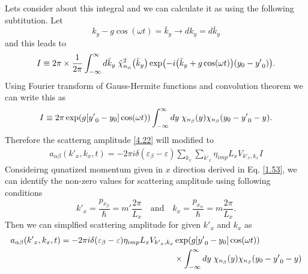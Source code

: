 \noindent
Lets consider about this integral and we can calculate it as using the following subtitution. Let
\begin{equation} \label{4.39}
  {k}_y -g\cos(\omega t) = \bar{k}_y \longrightarrow d{k}_y = d\bar{k}_y
\end{equation}
and this leads to
\begin{equation} \label{4.40}
    I \equiv
    2\pi \times \frac{1}{2\pi}
    \int_{-\infty}^{\infty} d\bar{k}_y \;
    \tilde{\chi}_{n_{\alpha}}^2 \qty(\bar{k}_y)
    \exp(
      -i\qty(\bar{k}_y + g\cos(\omega t)) \qty(y_0 - {y'}_0)
    ).
\end{equation}
Using Fourier transform of Gauss-Hermite functions and convolution theorem we can write this as
\begin{equation} \label{4.41}
    I \equiv
    {2\pi}
    \exp(g[{y'}_0 - y_0]\cos(\omega t))
    \int_{-\infty}^{\infty} dy \;
    {\chi}_{n_{\beta}}\qty(y)
    {\chi}_{n_{\beta}}\qty(y_0 - {y'}_0 - y).
\end{equation}
Therefore the scatterng amplitude \eqref{4.22} will modified to
\begin{equation} \label{4.42}
  \begin{aligned}
    a_{\alpha\beta}({k'}_x,k_x,t)  =
    -2\pi i
    \delta(\varepsilon_{\beta} - \varepsilon)
    \sum_{k_x}\sum_{{k'}_x}
    {\eta_{imp} L_x V_{{k'}_x,k_x}} I
  \end{aligned}
\end{equation}
Consideirng qunatized momentum given in $x$ direction derived in Eq. \eqref{1.53}, we can identify the non-zero values for scattering amplitude using following conditions
\begin{equation} \label{4.43}
    {k'}_x = \frac{p_{x_{\beta}}}{\hbar} = m' \frac{2\pi}{L_x}
    \quad \text{and} \quad
    k_x = \frac{p_{x_{\alpha}}}{\hbar} = m \frac{2\pi}{L_x}.
\end{equation}
Then we can simplfied scattering amplitude for given ${k'}_x$ and $k_x$ as
\begin{equation} \label{4.44}
  \begin{aligned}
    a_{\alpha\beta}({k'}_x,k_x,t)  =
    -2\pi i
    \delta(\varepsilon_{\beta} - \varepsilon)
    \eta_{imp} L_x V_{{k'}_x,k_x}&
    \exp(g[{y'}_0 - y_0]\cos(\omega t)) \\
    & \times
    \int_{-\infty}^{\infty} dy \;
    {\chi}_{n_{\beta}}\qty(y)
    {\chi}_{n_{\beta}}\qty(y_0 - {y'}_0 - y)
  \end{aligned}
\end{equation}
